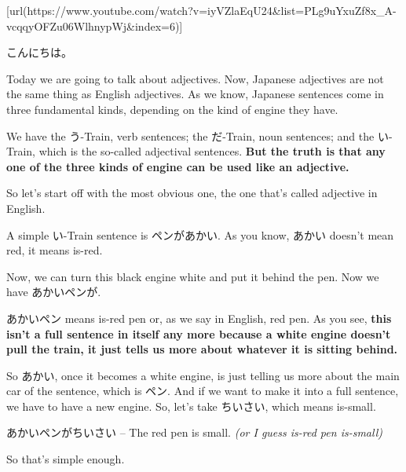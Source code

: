 \startsectionlevel[title={{\bf 6. Adjectives}},reference={adjectives}]

[url(https://www.youtube.com/watch?v=iyVZlaEqU24&list=PLg9uYxuZf8x_A-vcqqyOFZu06WlhnypWj&index=6)]

こんにちは。

Today we are going to talk about adjectives. Now, Japanese adjectives are not the same thing as English adjectives. As we know, Japanese sentences come in three fundamental kinds, depending on the kind of engine they have.

{}

We have the う-Train, verb sentences; the だ-Train, noun sentences; and the い-Train, which is the so-called adjectival sentences. {\bf But the truth is that any one of the three kinds of engine can be used like an adjective.}

{}

So let's start off with the most obvious one, the one that's called adjective in English.

\startsectionlevel[title={い-train adjectives},reference={い-train-adjectives}]

A simple い-Train sentence is ペンがあかい. As you know, あかい doesn't mean red, it means is-red.

{}

Now, we can turn this black engine white and put it behind the pen. Now we have あかいペンが.

{}

あかいペン means is-red pen or, as we say in English, red pen. As you see, {\bf this isn't a full sentence in itself any more because a white engine doesn't pull the train, it just tells us more about whatever it is sitting behind.}

So あかい, once it becomes a white engine, is just telling us more about the main car of the sentence, which is ペン. And if we want to make it into a full sentence, we have to have a new engine. So, let's take ちいさい, which means is-small.

あかいペンがちいさい -- The red pen is small. {\em (or I guess is-red pen is-small)}

{}

So that's simple enough.

